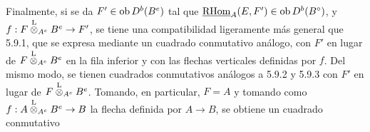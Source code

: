 Finalmente, si se da $F'\in\operatorname{ob} D^b(B^e)$ tal que $\underline{\mathrm{RHom}}_A(E,F')\in\operatorname{ob} D^b(B^\circ)$, y $f:F\overset{\mathrm L}{\otimes}_{A^e}B^e\to F'$, se tiene una compatibilidad ligeramente más general que 5.9.1, que se expresa mediante un cuadrado conmutativo análogo, con $F'$ en lugar de $F\overset{\mathrm L}{\otimes}_{A^e}B^e$ en la fila inferior y con las flechas verticales definidas por $f$. Del mismo modo, se tienen cuadrados conmutativos análogos a 5.9.2 y 5.9.3 con $F'$ en lugar de $F\overset{\mathrm L}{\otimes}_{A^e}B^e$. Tomando, en particular, $F=A$ y tomando como $f:A\overset{\mathrm L}{\otimes}_{A^e}B^e\to B$ la flecha definida por $A\to B$, se obtiene un cuadrado conmutativo
